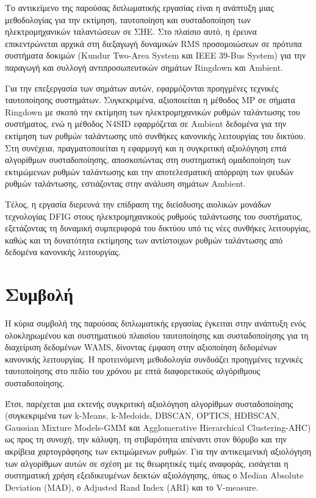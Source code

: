 Το αντικείμενο της παρούσας διπλωματικής εργασίας είναι η ανάπτυξη μιας μεθοδολογίας για την εκτίμηση, ταυτοποίηση και συσταδοποίηση των ηλεκτρομηχανικών ταλαντώσεων σε ΣΗΕ. Στο πλαίσιο αυτό, η έρευνα επικεντρώνεται αρχικά στη διεξαγωγή δυναμικών RMS προσομοιώσεων σε πρότυπα συστήματα δοκιμών (Kundur Two-Area System και IEEE 39-Bus System) για την παραγωγή και συλλογή αντιπροσωπευτικών σημάτων Ringdown και Ambient.

Για την επεξεργασία των σημάτων αυτών, εφαρμόζονται προηγμένες τεχνικές ταυτοποίησης συστημάτων. Συγκεκριμένα, αξιοποιείται η μέθοδος MP σε σήματα Ringdown με σκοπό την εκτίμηση των ηλεκτρομηχανικών ρυθμών ταλάντωσης του συστήματος, ενώ η μέθοδος N4SID εφαρμόζεται σε Ambient δεδομένα για την εκτίμηση των ρυθμών ταλάντωσης υπό συνθήκες κανονικής λειτουργίας του δικτύου. Στη συνέχεια, πραγματοποιείται η εφαρμογή και η συγκριτική αξιολόγηση επτά αλγορίθμων συσταδοποίησης, αποσκοπώντας στη συστηματική ομαδοποίηση των εκτιμώμενων ρυθμών ταλάντωσης και την αποτελεσματική απόρριψη των ψευδών ρυθμών ταλάντωσης, εστιάζοντας στην ανάλυση σημάτων \textenglish{Ambient}.

Τέλος, η εργασία διερευνά την επίδραση της διείσδυσης αιολικών μονάδων τεχνολογίας DFIG στους ηλεκτρομηχανικούς ρυθμούς ταλάντωσης του συστήματος, εξετάζοντας τη δυναμική συμπεριφορά του δικτύου υπό τις νέες συνθήκες λειτουργίας, καθώς και τη δυνατότητα εκτίμησης των αντίστοιχων ρυθμών ταλάντωσης από δεδομένα κανονικής λειτουργίας.


\section{Συμβολή}

Η κύρια συμβολή της παρούσας διπλωματικής εργασίας έγκειται στην ανάπτυξη ενός ολοκληρωμένου και συστηματικού πλαισίου ταυτοποίησης και συσταδοποίησης για τη διαχείριση δεδομένων WAMS, δίνοντας έμφαση στην αξιοποίηση δεδομένων κανονικής λειτουργίας. Η προτεινόμενη μεθοδολογία συνδυάζει προηγμένες τεχνικές ταυτοποίησης στο πεδίο του χρόνου με επτά διαφορετικούς αλγόριθμους συσταδοποίησης.

Έτσι, παρέχεται μια εκτενής συγκριτική αξιολόγηση αλγορίθμων συσταδοποίησης (συγκεκριμένα των k-Means, k-Medoids, DBSCAN, OPTICS, HDBSCAN, Gaussian Mixture Models-GMM και Agglomerative Hierarchical Clustering-AHC) ως προς τη συνοχή, την κάλυψη, τη στιβαρότητα απέναντι στον θόρυβο και την ακρίβεια χαρτογράφησης των εκτιμώμενων ρυθμών. Για την αντικειμενική αξιολόγηση των αλγορίθμων αυτών σε σχέση με τις θεωρητικές τιμές αναφοράς, εισάγεται η συστηματική χρήση εξειδικευμένων δεικτών αξιολόγησης, όπως ο Median Absolute Deviation (MAD), ο Adjusted Rand Index (ARI) και το V-measure.

